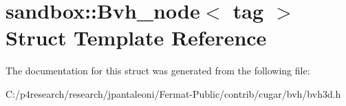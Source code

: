 \hypertarget{structsandbox_1_1_bvh__node}{}\section{sandbox\+:\+:Bvh\+\_\+node$<$ tag $>$ Struct Template Reference}
\label{structsandbox_1_1_bvh__node}


The documentation for this struct was generated from the following file\+:\begin{DoxyCompactItemize}
\item 
C\+:/p4research/research/jpantaleoni/\+Fermat-\/\+Public/contrib/cugar/bvh/bvh3d.\+h\end{DoxyCompactItemize}
